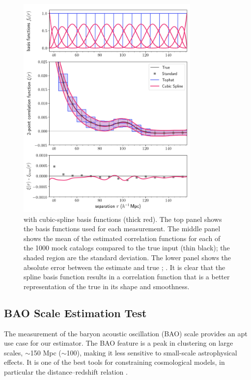 \begin{figure}[ht]
    \centering
        \includegraphics[width=0.8\textwidth]{xicomparison_2e-4_tophat8_spline}
        \caption{ \est with cubic-spline basis functions (thick red).  The top panel shows the basis functions used for each measurement. The middle panel shows the mean of the estimated correlation functions for each of the 1000 mock catalogs compared to the true input \cf (thin black); the shaded region  are the standard deviation. The lower panel shows the absolute error between the estimate and true \cf; . It is clear that the spline basis function results in a correlation function that is a better representation of the true \cf in its shape and smoothness.}
        \label{fig:spline}
    \end{figure}    

\subsection{BAO Scale Estimation Test}
\label{sec:bao}

The measurement of the baryon acoustic oscillation (BAO) scale provides an apt use case for our estimator.
The BAO feature is a peak in clustering on large scales, $\sim$150 Mpc ($\sim$100\hmpc), making it less sensitive to small-scale astrophysical effects.
It is one of the best tools for constraining cosmological models, in particular the distance--redshift relation \citep{Cole2005, Eisenstein2005, Kazin2010, Anderson2012, Anderson2014, Alam2017}.

